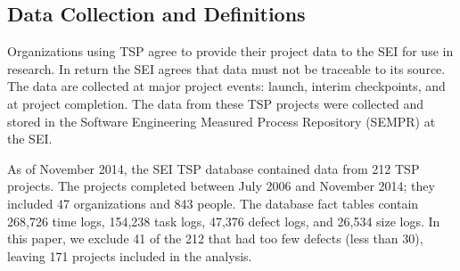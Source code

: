 \documentclass[smallcondensed]{svjour3}
\newcommand{\bi}{\begin{itemize}}%
\newcommand{\ei}{\end{itemize}}
\begin{document}
\subsection{Data Collection and Definitions}
\label{sect:data-collection}

Organizations using TSP agree to provide their project data to the SEI for use in research. In return the SEI agrees that  data must not be traceable to its source. The data are collected at major project events: launch, interim checkpoints, and at project completion. The data from these TSP projects were collected and stored in the Software Engineering Measured Process Repository (SEMPR) at the SEI. 

As of November 2014, the SEI TSP database contained data from 212
TSP projects. The projects completed between July 2006 and
November 2014; they included 47 organizations and 843 people. 
The database fact tables
contain 268,726 time logs, 
154,238 task logs,
 47,376 defect logs, 
and 26,534 size logs. 
In this paper, we exclude 41 of the 212 that had too few defects (less than 30), leaving 171 projects included in the analysis.

 

\end{document}
